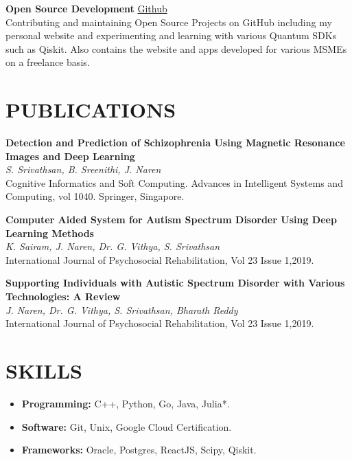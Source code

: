 \documentclass[a4paper,9pt]{extarticle}
\begin{document}
\noindent
\textbf{Open Source Development} \hfill \href{https://yumsastra.vathzen.in}{Github \faExternalLink}\\[1pt]
Contributing and maintaining Open Source Projects on GitHub including my personal website and experimenting and learning with various Quantum SDKs such as Qiskit. Also contains
the website and apps developed for various MSMEs on a freelance basis.

\section*{PUBLICATIONS}
\noindent
\textbf{Detection and Prediction of Schizophrenia Using Magnetic Resonance Images and Deep Learning}\\[1pt]
\textit{S. Srivathsan, B. Sreenithi, J. Naren}\\[1pt]
Cognitive Informatics and Soft Computing. Advances in Intelligent Systems and Computing, vol 1040. Springer, Singapore.

\noindent
\textbf{Computer Aided System for Autism Spectrum Disorder Using Deep Learning Methods}\\[1pt]
\textit{K. Sairam, J. Naren, Dr. G. Vithya, S. Srivathsan}\\[1pt]
International Journal of Psychosocial Rehabilitation, Vol 23 Issue 1,2019.

\noindent
\textbf{Supporting Individuals with Autistic Spectrum Disorder with Various Technologies: A Review}\\[1pt]
\textit{J. Naren, Dr. G. Vithya, S. Srivathsan, Bharath Reddy}\\[1pt]
International Journal of Psychosocial Rehabilitation, Vol 23 Issue 1,2019.

\section*{SKILLS}
\begin{itemize}
    \item \textbf{Programming:} C++, Python, Go, Java, Julia*.
    \item \textbf{Software:} Git, Unix, Google Cloud Certification.
    \item \textbf{Frameworks:} Oracle, Postgres, ReactJS, Scipy, Qiskit.
\end{itemize}
\end{document}
